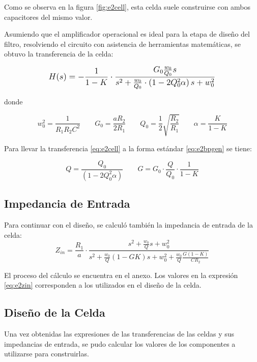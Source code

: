 Como se observa en la figura \ref{fig:e2cell}, esta celda suele construirse con ambos capacitores del mismo valor.

Asumiendo que el amplificador operacional es ideal para la etapa de diseño del filtro, resolviendo el circuito con asistencia de herramientas matemáticas, se obtuvo la transferencia de la celda:

\begin{equation}
\mathlarger{
H(s)=-\frac{1}{1-K}\cdot\frac{G_0 \frac{w_0}{Q_0}s}{s^2 + \frac{w_0}{Q_0}\cdot\left(1-2 Q_0^2\alpha\right)s + w_0^2}
}
\label{eq:e2cell}
\end{equation}

donde

\begin{equation*}
w_0^2=\frac{1}{R_1R_2C^2} \qquad G_0 = \frac{aR_2}{2R_1} \qquad Q_0=\frac{1}{2}\sqrt{\frac{R_2}{R_1}} \qquad	\alpha=\frac{K}{1-K}
\end{equation*}

Para llevar la transferencia \eqref{eq:e2cell} a la forma estándar \eqref{eq:e2bpgen} se tiene:

\begin{equation*}
Q = \frac{Q_0}{\left(1-2 Q_0^2\alpha\right)} \qquad	G=G_0\cdot\frac{Q}{Q_0}\cdot\frac{1}{1-K}
\end{equation*}

\subsection{Impedancia de Entrada}

Para continuar con el diseño, se calculó también la impedancia de entrada de la celda:
\begin{equation}
Z_{in} = \frac{R_1}{a} \cdot \frac{s^2 + \frac{w_0}{Q}s + w_0^2}{s^2 + \frac{w_0}{Q}(1-GK) s + w_0^2 + \frac{w_0}{Q} \frac{G(1-K)}{C R_2}}
\label{eq:e2zin}
\end{equation}

El proceso del cálculo se encuentra en el anexo. Los valores en la expresión \eqref{eq:e2zin} corresponden a los utilizados en el diseño de la celda. 

\subsection{Diseño de la Celda}

Una vez obtenidas las expresiones de las transferencias de las celdas y sus impedancias de entrada, se pudo calcular los valores de los componentes a utilizarse para construirlas.

